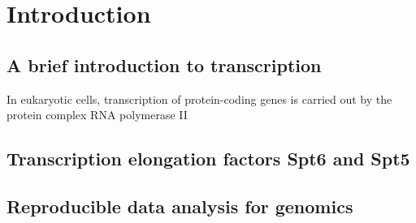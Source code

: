 \chapter*{Introduction}

\section*{A brief introduction to transcription}

In eukaryotic cells, transcription of protein-coding genes is carried out by the protein complex RNA polymerase II

\section*{Transcription elongation factors Spt6 and Spt5}

\section*{Reproducible data analysis for genomics}

\lipsum[1]
